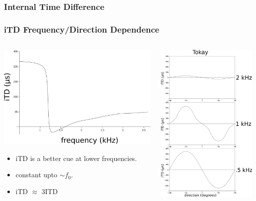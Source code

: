 \documentclass{beamer}
\begin{document}
\subsubsection{Internal Time Difference}
\begin{frame}[t]
\frametitle{iTD Frequency/Direction Dependence}
\begin{columns}
\begin{column}{0.5\textwidth}
 \includegraphics[width = 6 cm]{Diagrams/Presentation/iTDspectrum.png}
\begin{exampleblock}{}
\small
 \begin{itemize}
  \item iTD is a better cue at lower frequencies.
  \item constant upto $\sim f_0$.
  \item iTD $\approx$ 3ITD
 \end{itemize}
\end{exampleblock}
\end{column}
     \begin{column}{0.5\textwidth}
     \flushright
 \includegraphics[width = 3.8 cm]{Diagrams/Presentation/iTDdirection.png}
\end{column}
\end{columns}
\end{frame}
\end{document}
